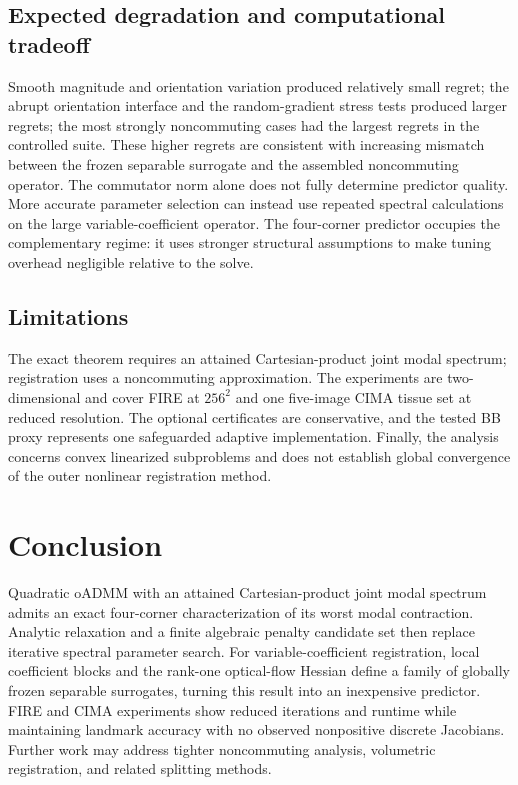 \documentclass[11pt]{article}
\theoremstyle{definition}
\begin{document}
\subsection{Expected degradation and computational tradeoff}
Smooth magnitude and orientation variation produced relatively small regret;
the abrupt orientation interface and the random-gradient stress tests produced
larger regrets; the most strongly noncommuting cases had the largest regrets
in the controlled suite. These higher regrets are consistent with increasing
mismatch between the frozen separable surrogate and the assembled
noncommuting operator. The commutator norm alone does not fully determine
predictor quality.
More accurate parameter selection
can instead use repeated spectral calculations on the large
variable-coefficient operator. The four-corner predictor occupies the
complementary regime: it uses stronger structural assumptions to make tuning
overhead negligible relative to the solve.

\subsection{Limitations}
The exact theorem requires an attained Cartesian-product joint modal spectrum;
registration uses a noncommuting approximation. The experiments are
two-dimensional and cover FIRE at $256^2$ and one five-image CIMA tissue set at
reduced resolution. The optional certificates are conservative, and the
tested BB proxy represents one safeguarded adaptive implementation. Finally,
the analysis concerns convex linearized subproblems and does not establish
global convergence of the outer nonlinear registration method.

\section{Conclusion}\label{sec:conclusion}
Quadratic oADMM with an attained Cartesian-product joint modal spectrum admits
an exact four-corner characterization of its worst modal contraction. Analytic
relaxation and a finite algebraic penalty candidate set then replace iterative
spectral parameter search. For variable-coefficient registration, local
coefficient blocks and the rank-one optical-flow Hessian define a family of
globally frozen separable surrogates, turning this result into an inexpensive
predictor. FIRE and CIMA experiments show reduced iterations and runtime while
maintaining landmark accuracy with no observed nonpositive discrete Jacobians.
Further work may address tighter noncommuting analysis, volumetric
registration, and related splitting methods.
\end{document}
